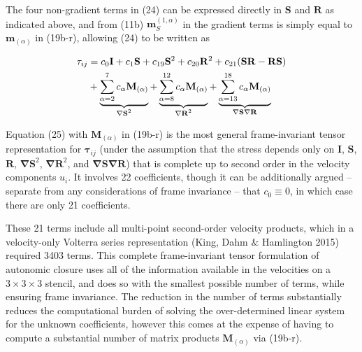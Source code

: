 The four non-gradient terms in (24) can be expressed directly in $\mathbf{S}$ and $\mathbf{R}$ as indicated above, and from (11b)  $\mathbf{m}^{(1,\alpha)}_{S}$ in the gradient terms is simply equal to $\mathbf{m}_{(\alpha)}$ in (19b-r), allowing (24) to be written as


%
\begin{align}
	\label{E:42}
	\mathbf{\tau}_{ij} &=  c_{0} \mathbf{I}
	+ c_{1} \mathbf{S}
	+ c_{19} \mathbf{S}^2
	+ c_{20} \mathbf{R}^2
	+ c_{21} (\mathbf{SR-RS}) \notag \\
	&+ \underbrace{
				\sum_{\alpha=2}^{7} c_{\alpha} \mathbf{M}_{(\alpha)}
				 } %
				_{\text{ $\mathbf{\nabla S}^2$ }}
	+ \underbrace{
				\sum_{\alpha=8}^{12} c_{\alpha} \mathbf{M}_{(\alpha)}
				 } %
				_{\text{ $\mathbf{\nabla R}^2$ }}
	+ \underbrace{
				\sum_{\alpha=13}^{18} c_{\alpha} \mathbf{M}_{(\alpha)}
				 } %
				_{\text{ $\mathbf{\nabla S \nabla R}$ }}
\end{align}
%
%   

Equation (25) with $\mathbf{M}_{(\alpha)}$  in (19b-r) is the most general frame-invariant tensor representation for $\mathbf{\tau}_{ij}$  (under the assumption that the stress depends only on $\mathbf{I}$, $\mathbf{S}$, $\mathbf{R}$, $\mathbf{\nabla S}^{2}$, $\mathbf{\nabla R}^{2}$, and $\mathbf{\nabla S \nabla R}$) that is complete up to second order in the velocity components  $u_i$.  It involves 22 coefficients, though it can be additionally argued – separate from any considerations of frame invariance – that $c_0 \equiv 0$, in which case there are only 21 coefficients. 

These 21 terms include all multi-point second-order velocity products, which in a velocity-only Volterra series representation (King, Dahm $\&$ Hamlington 2015) required 3403 terms. This complete frame-invariant tensor formulation of autonomic closure uses all of the information available in the velocities on a $3 \times 3 \times 3$  stencil, and does so with the smallest possible number of terms, while ensuring frame invariance. The reduction in the number of terms substantially reduces the computational burden of solving the over-determined linear system for the unknown coefficients, however this comes at the expense of having to compute a substantial number of matrix products $\mathbf{M}_{(\alpha)}$  via (19b-r).

